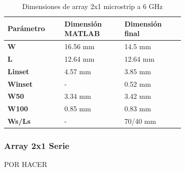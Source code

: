 \begin{table}[H]
  
   \label{tab:array2x12}
   \small %
   \centering %
   \begin{tabular}{m{0.2\linewidth}m{0.25\linewidth}m{0.25\linewidth}} %
   \toprule[\heavyrulewidth]\toprule[\heavyrulewidth]
   \textbf{Parámetro} & \textbf{Dimensión MATLAB} & \textbf{Dimensión final} \\ 
   \midrule
   \textbf{W} & 16.56 mm & 14.5 mm \\
   \textbf{L} & 12.64 mm & 12.64 mm\\
   \textbf{Linset} & 4.57 mm & 3.85 mm\\
   \textbf{Winset} & - & 0.52 mm\\
   \textbf{W50} & 3.34 mm & 3.42 mm\\
   \textbf{W100} & 0.85 mm & 0.83 mm\\
   \textbf{Ws/Ls} & - & 70/40 mm\\
   \bottomrule[\heavyrulewidth] 
   \end{tabular}
   \caption{Dimensiones de array 2x1 microstrip a 6 GHz} 
\end{table}




\subsubsection{Array 2x1 Serie} 
\par POR HACER




